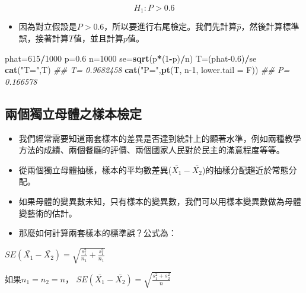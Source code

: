 \documentclass[hyperref,]{ctexart}
\newenvironment{Shaded}{\begin{snugshade}}{\end{snugshade}}
\newcommand{\CommentTok}[1]{\textcolor[rgb]{0.56,0.35,0.01}{\textit{#1}}}
\newcommand{\DataTypeTok}[1]{\textcolor[rgb]{0.13,0.29,0.53}{#1}}
\newcommand{\DecValTok}[1]{\textcolor[rgb]{0.00,0.00,0.81}{#1}}
\newcommand{\FloatTok}[1]{\textcolor[rgb]{0.00,0.00,0.81}{#1}}
\newcommand{\KeywordTok}[1]{\textcolor[rgb]{0.13,0.29,0.53}{\textbf{#1}}}
\newcommand{\NormalTok}[1]{#1}
\newcommand{\OperatorTok}[1]{\textcolor[rgb]{0.81,0.36,0.00}{\textbf{#1}}}
\newcommand{\StringTok}[1]{\textcolor[rgb]{0.31,0.60,0.02}{#1}}
\providecommand{\tightlist}{%
  \setlength{\itemsep}{0pt}\setlength{\parskip}{0pt}}
\begin{document}
\[H_{1}: P>0.6\]

\begin{itemize}
\tightlist
\item
  因為對立假設是\(P>0.6\)，所以要進行右尾檢定。我們先計算\(\hat{p}\)，然後計算標準誤，接著計算\(T\)值，並且計算\(p\)值。
\end{itemize}

\begin{Shaded}
\begin{Highlighting}[]
\NormalTok{phat=}\DecValTok{615}\OperatorTok{/}\DecValTok{1000}
\NormalTok{p=}\FloatTok{0.6}
\NormalTok{n=}\DecValTok{1000}
\NormalTok{se=}\KeywordTok{sqrt}\NormalTok{(p}\OperatorTok{*}\NormalTok{(}\DecValTok{1}\OperatorTok{-}\NormalTok{p)}\OperatorTok{/}\NormalTok{n)}
\NormalTok{T=(phat}\FloatTok{-0.6}\NormalTok{)}\OperatorTok{/}\NormalTok{se}
\KeywordTok{cat}\NormalTok{(}\StringTok{"T="}\NormalTok{,T)}
\CommentTok{## T= 0.9682458}
\KeywordTok{cat}\NormalTok{(}\StringTok{"P="}\NormalTok{,}\KeywordTok{pt}\NormalTok{(T, n}\DecValTok{-1}\NormalTok{, }\DataTypeTok{lower.tail =}\NormalTok{ F))}
\CommentTok{## P= 0.166578}
\end{Highlighting}
\end{Shaded}

\hypertarget{ux5169ux500bux7368ux7acbux6bcdux9ad4ux4e4bux6a23ux672cux6aa2ux5b9a}{%
\subsection{兩個獨立母體之樣本檢定}\label{ux5169ux500bux7368ux7acbux6bcdux9ad4ux4e4bux6a23ux672cux6aa2ux5b9a}}

\begin{itemize}
\item
  我們經常需要知道兩套樣本的差異是否達到統計上的顯著水準，例如兩種教學方法的成績、兩個餐廳的評價、兩個國家人民對於民主的滿意程度等等。
\item
  從兩個獨立母體抽樣，樣本的平均數差異(\(\bar{X_{1}}-\bar{X_{2}}\))的抽樣分配趨近於常態分配。
\item
  如果母體的變異數未知，只有樣本的變異數，我們可以用樣本變異數做為母體變藝術的估計。
\item
  那麼如何計算兩套樣本的標準誤？公式為：
\end{itemize}

\(SE(\bar{X_{1}}-\bar{X_{2}})=\sqrt{\frac{s_{1}^{2}}{n_{1}}+\frac{s_{1}^{2}}{n_{1}}}\)

如果\(n_{1}=n_{2}=n\)，
\(SE(\bar{X_{1}}-\bar{X_{2}})=\sqrt{\frac{s_{1}^{2}+s_{2}^{2}}{n}}\)
\end{document}
